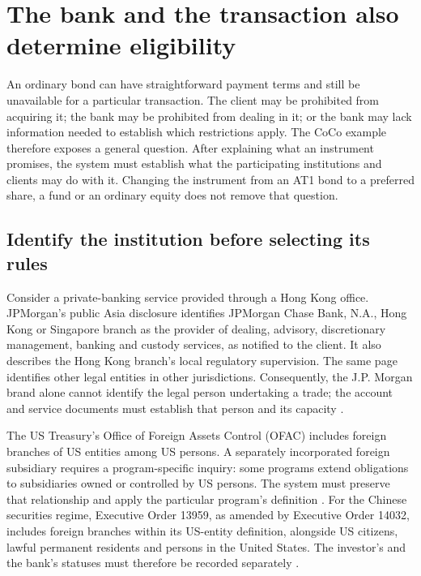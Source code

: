 \section{The bank and the transaction also determine eligibility}
\label{sec:bank-compliance}

An ordinary bond can have straightforward payment terms and still be unavailable
for a particular transaction. The client may be prohibited from acquiring it;
the bank may be prohibited from dealing in it; or the bank may lack information
needed to establish which restrictions apply. The CoCo example therefore exposes
a general question. After explaining what an instrument promises, the system
must establish what the participating institutions and clients may do with it.
Changing the instrument from an AT1 bond to a preferred share, a fund or an
ordinary equity does not remove that question.

\subsection{Identify the institution before selecting its rules}

Consider a private-banking service provided through a Hong Kong office.
JPMorgan's public Asia disclosure identifies JPMorgan Chase Bank, N.A., Hong
Kong or Singapore branch as the provider of dealing, advisory, discretionary
management, banking and custody services, as notified to the client. It also
describes the Hong Kong branch's local regulatory supervision. The same page
identifies other legal entities in other jurisdictions. Consequently, the
J.P. Morgan brand alone cannot identify the legal person undertaking a trade;
the account and service documents must establish that person and its capacity
\citep[Asia service-provider disclosure]{jpmprivatebank2026}.

The US Treasury's Office of Foreign Assets Control (OFAC) includes foreign
branches of US entities among US persons. A separately incorporated foreign
subsidiary requires a program-specific inquiry: some programs extend obligations
to subsidiaries owned or controlled by US persons. The system must preserve
that relationship and apply the particular program's definition
\citep[FAQ 11]{ofacuspersons2024}. For the Chinese securities regime, Executive
Order 13959, as amended by Executive Order 14032, includes foreign branches
within its US-entity definition, alongside US citizens, lawful permanent
residents and persons in the United States. The investor's and the bank's
statuses must therefore be recorded separately
\citep[replacement section 3(d)]{eo140322021}.

